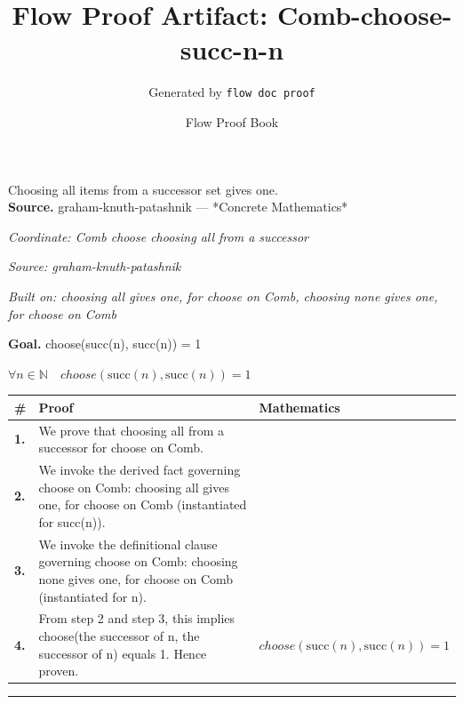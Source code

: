 \documentclass[11pt]{article}
\title{Flow Proof Artifact: Comb-choose-succ-n-n}
\author{Generated by \texttt{flow doc proof}}
\date{Flow Proof Book}
\theoremstyle{definition}
\begin{document}
\maketitle
Choosing all items from a successor set gives one.\\[0.5em]
\textbf{Source.} graham-knuth-patashnik — *Concrete Mathematics*\\[0.5em]
\bigskip
{}\par
\smallskip\noindent\textit{Coordinate: Comb \cdot choose \cdot choosing all from a successor}\par
\smallskip\noindent\textit{Source: graham-knuth-patashnik}\par
\smallskip\noindent\textit{Built on: choosing all gives one, for choose on Comb, choosing none gives one, for choose on Comb}\par
\medskip
\noindent\textbf{Goal.} choose(succ(n), succ(n)) = 1\par
\noindent$\displaystyle \forall n \in \mathbb{N}\quad choose(\mathrm{succ}(n), \mathrm{succ}(n)) = 1$\par
\medskip
\noindent
\begin{tabular}{@{} >{\raggedright\arraybackslash}p{} >{\raggedright\arraybackslash}p{} >{\raggedleft\arraybackslash}p{} @{}}
\textbf{\#} & \textbf{Proof} & \textbf{Mathematics} \\
\midrule
\textbf{1.} & We prove that choosing all from a successor for choose on Comb. & \\[0.45em]
\textbf{2.} & We invoke the derived fact governing choose on Comb: choosing all gives one, for choose on Comb (instantiated for succ(n)). & \\[0.45em]
\textbf{3.} & We invoke the definitional clause governing choose on Comb: choosing none gives one, for choose on Comb (instantiated for n). & \\[0.45em]
\textbf{4.} & From step 2 and step 3, this implies choose(the successor of n, the successor of n) equals 1. Hence proven. & $\displaystyle choose(\mathrm{succ}(n), \mathrm{succ}(n)) = 1$ \\[0.45em]
\bottomrule
\end{tabular}
\label{thm:Comb-choose-choosing_all_from_a_successor}
\par\medskip\hrule
\end{document}
